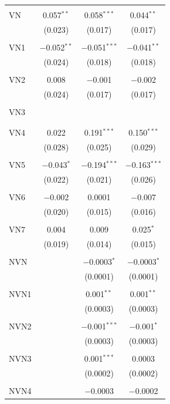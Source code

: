 \begin{table}[!htbp]
\begin{tabular}{@{\extracolsep{5pt}}lccc}
  & & & \\ 
 VN & 0.057$^{**}$ & 0.058$^{***}$ & 0.044$^{**}$ \\ 
  & (0.023) & (0.017) & (0.017) \\ 
  & & & \\ 
 VN1 & $-$0.052$^{**}$ & $-$0.051$^{***}$ & $-$0.041$^{**}$ \\ 
  & (0.024) & (0.018) & (0.018) \\ 
  & & & \\ 
 VN2 & 0.008 & $-$0.001 & $-$0.002 \\ 
  & (0.024) & (0.017) & (0.017) \\ 
  & & & \\ 
 VN3 &  &  &  \\ 
  &  &  &  \\ 
  & & & \\ 
 VN4 & 0.022 & 0.191$^{***}$ & 0.150$^{***}$ \\ 
  & (0.028) & (0.025) & (0.029) \\ 
  & & & \\ 
 VN5 & $-$0.043$^{*}$ & $-$0.194$^{***}$ & $-$0.163$^{***}$ \\ 
  & (0.022) & (0.021) & (0.026) \\ 
  & & & \\ 
 VN6 & $-$0.002 & 0.0001 & $-$0.007 \\ 
  & (0.020) & (0.015) & (0.016) \\ 
  & & & \\ 
 VN7 & 0.004 & 0.009 & 0.025$^{*}$ \\ 
  & (0.019) & (0.014) & (0.015) \\ 
  & & & \\ 
 NVN &  & $-$0.0003$^{*}$ & $-$0.0003$^{*}$ \\ 
  &  & (0.0001) & (0.0001) \\ 
  & & & \\ 
 NVN1 &  & 0.001$^{**}$ & 0.001$^{**}$ \\ 
  &  & (0.0003) & (0.0003) \\ 
  & & & \\ 
 NVN2 &  & $-$0.001$^{***}$ & $-$0.001$^{*}$ \\ 
  &  & (0.0003) & (0.0003) \\ 
  & & & \\ 
 NVN3 &  & 0.001$^{***}$ & 0.0003 \\ 
  &  & (0.0002) & (0.0002) \\ 
  & & & \\ 
 NVN4 &  & $-$0.0003 & $-$0.0002 \\ 

\end{tabular}
\end{table}
